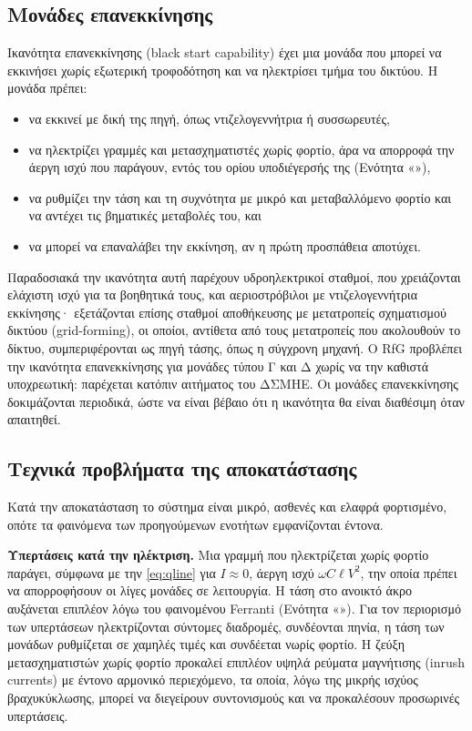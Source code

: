 \subsection{Μονάδες επανεκκίνησης}
\label{sec:blackstart}

Ικανότητα επανεκκίνησης (black start capability) έχει μια μονάδα που μπορεί να εκκινήσει χωρίς
εξωτερική τροφοδότηση και να ηλεκτρίσει τμήμα του δικτύου. Η μονάδα πρέπει:

\begin{itemize}
\item να εκκινεί με δική της πηγή, όπως ντιζελογεννήτρια ή συσσωρευτές,
\item να ηλεκτρίζει γραμμές και μετασχηματιστές χωρίς φορτίο, άρα να απορροφά την άεργη ισχύ που
      παράγουν, εντός του ορίου υποδιέγερσής της (Ενότητα «»),
\item να ρυθμίζει την τάση και τη συχνότητα με μικρό και μεταβαλλόμενο φορτίο και να αντέχει
      τις βηματικές μεταβολές του, και
\item να μπορεί να επαναλάβει την εκκίνηση, αν η πρώτη προσπάθεια αποτύχει.
\end{itemize}

Παραδοσιακά την ικανότητα αυτή παρέχουν υδροηλεκτρικοί σταθμοί, που χρειάζονται ελάχιστη ισχύ
για τα βοηθητικά τους, και αεριοστρόβιλοι με ντιζελογεννήτρια εκκίνησης· εξετάζονται επίσης
σταθμοί αποθήκευσης με μετατροπείς σχηματισμού δικτύου (grid-forming), οι οποίοι, αντίθετα
από τους μετατροπείς που ακολουθούν το δίκτυο, συμπεριφέρονται ως πηγή τάσης, όπως η σύγχρονη
μηχανή.
Ο RfG προβλέπει την ικανότητα επανεκκίνησης για μονάδες τύπου Γ και Δ χωρίς να την καθιστά
υποχρεωτική: παρέχεται κατόπιν αιτήματος του ΔΣΜΗΕ. Οι μονάδες επανεκκίνησης δοκιμάζονται
περιοδικά, ώστε να είναι βέβαιο ότι η ικανότητα θα είναι διαθέσιμη όταν απαιτηθεί.

\subsection{Τεχνικά προβλήματα της αποκατάστασης}
\label{sec:restoration-issues}

Κατά την αποκατάσταση το σύστημα είναι μικρό, ασθενές και ελαφρά φορτισμένο, οπότε τα
φαινόμενα των προηγούμενων ενοτήτων εμφανίζονται έντονα.

\textbf{Υπερτάσεις κατά την ηλέκτριση.} Μια γραμμή που ηλεκτρίζεται χωρίς φορτίο παράγει,
σύμφωνα με την \eqref{eq:qline} για $I \approx 0$, άεργη ισχύ $\omega C \ell V^2$, την οποία
πρέπει να απορροφήσουν οι λίγες μονάδες σε λειτουργία. Η τάση στο ανοικτό άκρο αυξάνεται
επιπλέον λόγω του φαινομένου Ferranti (Ενότητα «»). Για τον περιορισμό
των υπερτάσεων ηλεκτρίζονται σύντομες διαδρομές, συνδέονται πηνία, η τάση των μονάδων
ρυθμίζεται σε χαμηλές τιμές και συνδέεται νωρίς φορτίο. Η ζεύξη μετασχηματιστών χωρίς φορτίο
προκαλεί επιπλέον υψηλά ρεύματα μαγνήτισης (inrush currents) με έντονο αρμονικό περιεχόμενο, τα οποία, λόγω της
μικρής ισχύος βραχυκύκλωσης, μπορεί να διεγείρουν συντονισμούς και να προκαλέσουν προσωρινές
υπερτάσεις.

